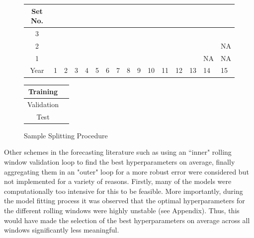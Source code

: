 \documentclass[11pt, a4paper, table]{article}
\begin{document}
\begin{figure}[!htb]
	\begin{center}
		\begin{tabular}{|c|p{0.40cm}p{0.40cm}p{0.40cm}p{0.40cm}p{0.40cm}p{0.40cm}p{0.40cm}p{0.40cm}p{0.40cm}p{0.40cm}p{0.40cm}p{0.40cm}p{0.40cm}p{0.40cm}p{0.40cm}|}
			\hline
			Set No. &&&&&&&&&&&&&&& \\
			\hline
			3 & \cellcolor{cyan} & \cellcolor{cyan} & \cellcolor{cyan} & \cellcolor{cyan} & \cellcolor{cyan} & \cellcolor{cyan} & \cellcolor{cyan} & \cellcolor{cyan} & \cellcolor{cyan} &
			\cellcolor{pink} & \cellcolor{pink} & \cellcolor{pink} & \cellcolor{pink} & \cellcolor{pink} & 	
			\cellcolor{olive} \\
			2 & \cellcolor{cyan} & \cellcolor{cyan} & \cellcolor{cyan} & \cellcolor{cyan} & \cellcolor{cyan} & \cellcolor{cyan} & \cellcolor{cyan} & \cellcolor{cyan} &
			\cellcolor{pink} & \cellcolor{pink} & \cellcolor{pink} & \cellcolor{pink} & \cellcolor{pink} & 	
			\cellcolor{olive} & NA  \\
			1 & \cellcolor{cyan} & \cellcolor{cyan} & \cellcolor{cyan} & \cellcolor{cyan} & \cellcolor{cyan} & \cellcolor{cyan} & \cellcolor{cyan} &
			\cellcolor{pink} & \cellcolor{pink} & \cellcolor{pink} & \cellcolor{pink} & \cellcolor{pink} & 	
			\cellcolor{olive} & NA & NA \\
			\hline
			Year & 1 & 2 & 3 & 4 & 5 & 6 & 7 & 8 & 9 & 10 & 11 & 12 & 13 & 14 & 15\\
			\hline
		\end{tabular}
		\medskip
		\begin{tabular}{|c|p{0.40cm}|}
			\hline
			Training & \cellcolor{cyan} \\
			\hline
			Validation & \cellcolor{pink} \\
			\hline
			Test & \cellcolor{olive} \\
			\hline
		\end{tabular}
	\end{center}
	\caption{Sample Splitting Procedure}
	\label{sample_split_diag}
\end{figure}

Other schemes in the forecasting literature such as using an ``inner" rolling window validation loop to find the best hyperparameters on average, finally aggregating them in an "outer" loop for a more robust error were considered but not implemented for a variety of reasons. Firstly, many of the models were computationally too intensive for this to be feasible. More importantly, during the model fitting process it was observed that the optimal hyperparameters for the different rolling windows were highly unstable (see Appendix). Thus, this would have made the selection of the best hyperparameters on average across all windows significantly less meaningful.
\end{document}
